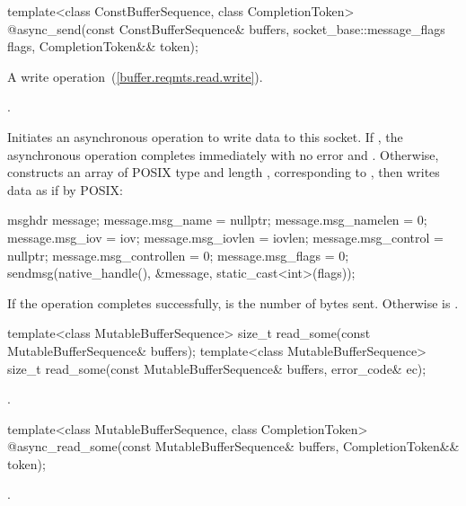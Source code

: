 \begin{itemdecl}
template<class ConstBufferSequence, class CompletionToken>
  @\DEDUCED@ async_send(const ConstBufferSequence& buffers,
                     socket_base::message_flags flags,
                     CompletionToken&& token);
\end{itemdecl}

\begin{itemdescr}
\pnum
A write operation~(\ref{buffer.reqmts.read.write}).

\pnum
\completionsig {}.

\pnum
\effects Initiates an asynchronous operation to write data to this socket. If , the asynchronous operation completes immediately with no error and . Otherwise, constructs an array  of POSIX type  and length , corresponding to , then writes data as if by POSIX:
\begin{codeblock}
msghdr message;
message.msg_name = nullptr;
message.msg_namelen = 0;
message.msg_iov = iov;
message.msg_iovlen = iovlen;
message.msg_control = nullptr;
message.msg_controllen = 0;
message.msg_flags = 0;
sendmsg(native_handle(), &message, static_cast<int>(flags));
\end{codeblock}


\pnum
If the operation completes successfully,  is the number of bytes sent. Otherwise  is .
\end{itemdescr}

\begin{itemdecl}
template<class MutableBufferSequence>
  size_t read_some(const MutableBufferSequence& buffers);
template<class MutableBufferSequence>
  size_t read_some(const MutableBufferSequence& buffers,
                   error_code& ec);
\end{itemdecl}

\begin{itemdescr}
\pnum
\returns {}.
\end{itemdescr}

\begin{itemdecl}
template<class MutableBufferSequence, class CompletionToken>
  @\DEDUCED@ async_read_some(const MutableBufferSequence& buffers,
                          CompletionToken&& token);
\end{itemdecl}

\begin{itemdescr}
\pnum
\returns {}.
\end{itemdescr}


